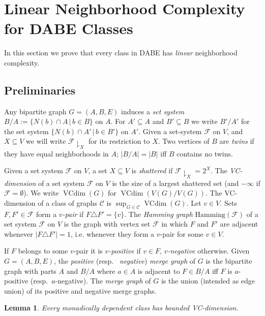 \documentclass[11pt]{article}
\newtheorem{lemma}[theorem]{Lemma}
\theoremstyle{definition}
\newcommand{\CC}{{\mathscr C}}
\newcommand{\inducedSS}[2]{#1/#2}%
\newcommand{\set}[1]{\{#1\}}
\newcommand{\setof}[2]{\set{#1 \,|\, #2 }}
\newcommand{\res}[1]{{\downharpoonright}_{#1}}
\renewcommand{\cal}{\mathcal}
\DeclareMathOperator{\VCdim}{VCdim}
\newcommand{\remph}[1]{{\color{red} \emph{#1}}}
\newcommand{\hamming}{\mathrm{Hamming}}
\begin{document}
\section{Linear Neighborhood Complexity for DABE Classes}
\label{sec:nc-dabe}

In this section we prove that every class in DABE has \emph{linear} neighborhood complexity.

\subsection{Preliminaries}

Any bipartite graph $G=(A,B,E)$ induces a \remph{set system} $\inducedSS{B}{A} := \setof{N(b)\cap A}{b\in B}$ on $A$.
For $A'\subseteq A$ and $B'\subseteq B$ we write $\inducedSS{B'}{A'}$ for the set system $\setof{N(b)\cap A'}{b\in B'}$ on $A'$. Given a set-system $\cal F$ on $V$, and $X \subseteq V$ we will write \remph{$\cal F\res X$} for its restriction to $X$.
Two vertices of $B$ are \remph{twins} if they have equal neighborhoods in $A$; $|\inducedSS{B}{A}|=|B|$ iff $B$ contains no twins.

Given a set system $\cal F$ on $V$, a set $X \subseteq V$ is \remph{shattered} if $\cal F\res X=2^X$.
The \remph{VC-dimension} of a set system $\cal F$ on $V$ is the size of a largest shattered set (and $-\infty$ if $\cal F=\emptyset$).
We write $\VCdim(G)$ for $\VCdim(\inducedSS{V(G)}{V(G)})$. The VC-dimension of a class of graphs $\CC$ is $\sup_{G \in \CC} \VCdim(G)$.
Let $v\in V$. Sets $F,F' \in \cal F$ form a \remph{$v$-pair} if $F\triangle F'=\set{v}$.
The \remph{Hamming graph} $\hamming(\cal F)$ of a set system $\cal F$ on $V$ is the graph with vertex set $\cal F$ in which $F$ and $F'$ are adjacent whenever $|F \triangle F'| = 1$, i.e. whenever they form a $v$-pair for some $v \in V$.

If $F$ belongs to some $v$-pair it is \remph{$v$-positive} if $v\in F$, \remph{$v$-negative} otherwise.
Given $G=(A,B,E)$, the \remph{positive} (resp.\ \remph{negative}) \remph{merge graph} of $G$ is the bipartite graph with parts $A$ and $\inducedSS{B}{A}$ where $a\in A$ is adjacent to $F\in \inducedSS{B}{A}$ iff $F$ is $a$-positive (resp.\ $a$-negative).
The \remph{merge graph} of $G$ is the union (intended as edge union) of its positive and negative merge graphs.

\begin{lemma}\label{lem:dep-bounded-vc}
Every monadically dependent class has bounded VC-dimension.
\end{lemma}
\end{document}
